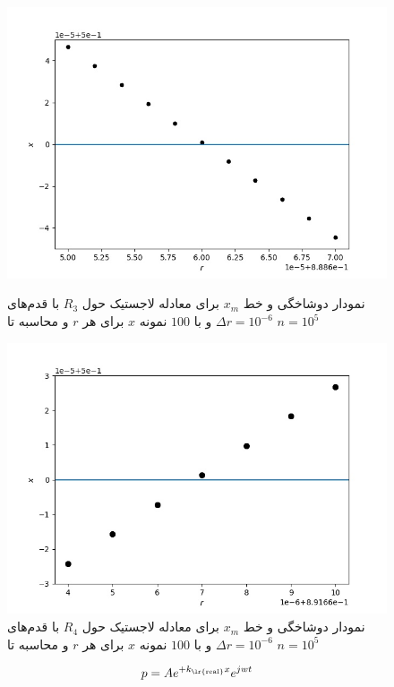 \documentclass[11pt, a4paper]{article}
\begin{document}
\begin{figure}[h!]
	\centering
  \begin{minipage}[b]{0.48\textwidth}
    \includegraphics[width=\textwidth]{q4_0.88865_0.88867_11_100_100000.jpg}
    \caption{نمودار دوشاخگی و خط $x_m$ برای معادله لاجستیک حول $R_3$ با قدم‌های $\Delta r = 10^{-6}$ و با $100$ نمونه $x$ برای هر $r$ و محاسبه تا $n = 10^5$}
    \label{fig:q4_R_3}
  \end{minipage}
  \hfill
  \begin{minipage}[b]{0.48\textwidth}
    \includegraphics[width=\textwidth]{q4_0.891664_0.89167_7_100_10000.jpg}
    \caption{نمودار دوشاخگی و خط $x_m$ برای معادله لاجستیک حول $R_4$ با قدم‌های $\Delta r = 10^{-6}$ و با $100$ نمونه $x$ برای هر $r$ و محاسبه تا $n = 10^5$}
    \label{fig:q4_R_4}
  \end{minipage}
\end{figure}


\begin{equation}
  p = A e^{+k_{\text{\lr{real}}}x} e^{jwt}
\end{equation}
\end{document}
